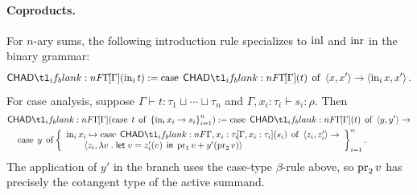 \documentclass[11pt,a4paper]{article}
\theoremstyle{definition}
\theoremstyle{remark}
\providecommand{\letst}[3]{\mathsf{let}\;#1=#2\;\mathsf{in}\;#3}
\begin{document}
\paragraph{Coproducts.}
For \(n\)-ary sums, the following introduction rule specializes to
\(\opn[b]{inl}\) and \(\opn[b]{inr}\) in the binary grammar:
\begin{equation}
  \label{eq:appendix-chad-sum-intro}
  \Fun[np]{\chad[\Gamma]}{\opn[b]{in}_{i}t}
  :=
  \opn[b]{case}\;\Fun[np]{\chad[\Gamma]}{t}\;\opn[b]{of}\;\tuple{x,x'}\to
  \tuple{\opn[b]{in}_{i}x,x'}.
\end{equation}
For case analysis, suppose
\(\Gamma\vdash t:\tau_{1}\sqcup\cdots\sqcup\tau_{n}\) and
\(\Gamma,x_{i}:\tau_{i}\vdash s_{i}:\rho\).  Then
\begin{align}
  \label{eq:appendix-chad-sum-elim}
  &\Fun[np]{\chad[\Gamma]}{
    \opn[b]{case}\;t\;\opn[b]{of}\;
    \left\{\opn[b]{in}_{i}x_{i}\to s_{i}\right\}_{i=1}^{n}
  }
  :=
  \opn[b]{case}\;\Fun[np]{\chad[\Gamma]}{t}\;\opn[b]{of}\;\tuple{y,y'}\to
  \notag\\
  &\quad
  \opn[b]{case}\;y\;\opn[b]{of}
  \left\{
  \begin{array}{l}
    \opn[b]{in}_{i}x_{i}\mapsto
    \opn[b]{case}\;\Fun[np]{\chad[\Gamma,x_{i}:\tau_{i}]}{s_{i}}\;\opn[b]{of}\;\tuple{z_{i},z_{i}'}\to
    \\
    \qquad
    \tuple{
      z_{i},
      \lambda v\; .\;
      \letst{v}{\fn[n]{z_{i}'}{v}}{
        \opn[b]{pr}_{1}v
        +
        \fn[n]{y'}{\opn[b]{pr}_{2}v}
      }
    }
  \end{array}
  \right\}_{i=1}^{n}.
\end{align}
The application of \(y'\) in the branch uses the case-type \(\beta\)-rule above,
so \(\opn[b]{pr}_{2}v\) has precisely the cotangent type of the active summand.
\end{document}
